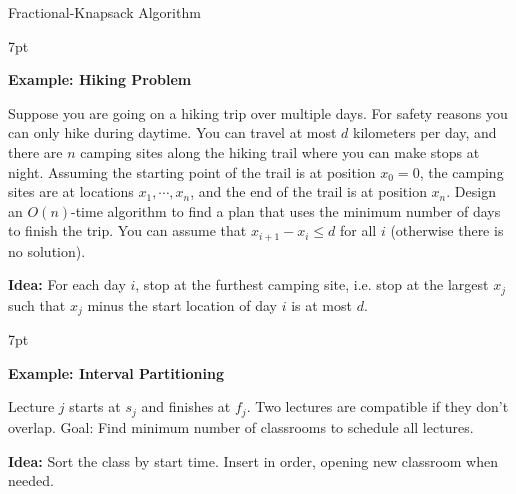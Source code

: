 \documentclass[10pt]{article}
\newenvironment{formal}[2]{%
	\def\FrameCommand{%
		\hspace{1pt}%
		{\color{#1}\vrule width 2pt}%
		{\color{#2}\vrule width 4pt}%
		\colorbox{#2}%
	}%
	\MakeFramed{\advance\hsize-\width\FrameRestore}%
	\noindent\hspace{-4.55pt}%
	\begin{adjustwidth}{}{7pt}%
		\vspace{2pt}\vspace{2pt}%
	}
	{%
		\vspace{2pt}\end{adjustwidth}\endMakeFramed%
}
\begin{document}
\begin{algorithm}
	\SetAlgoLined
	
	\caption{Fractional-Knapsack Algorithm}
\end{algorithm}

\newpage

\begin{formal}{Brown}{brownshade}
	
	\textbf{Example: Hiking Problem}

	Suppose you are going on a hiking trip over multiple days. For safety reasons you can only hike during daytime. You can travel at most $d$ kilometers per day, and there are $n$ camping sites along the hiking trail where you can make stops at night.
	Assuming the starting point of the trail is at position $x_0 = 0$, the camping sites are at locations $x_1, \cdots, x_n$, and the end of the trail is at position $x_n$.
	Design an $O(n)$-time algorithm to find a plan that uses the minimum number of days to finish the trip. You can assume that $x_{i+1} − x_i \leq d$ for all $i$ (otherwise there is no solution).

	\textbf{Idea:} For each day $i$, stop at the furthest camping site, i.e. stop at the largest $x_j$ such that $x_j$ minus the start location of day $i$ is at most $d$.

\end{formal}

\begin{formal}{Brown}{brownshade}
	
	\textbf{Example: Interval Partitioning}

	Lecture $j$ starts at $s_j$ and finishes at $f_j$. Two lectures are compatible if they don't overlap. Goal: Find minimum number of classrooms to schedule all lectures.

	\textbf{Idea:} Sort the class by start time. Insert in order, opening new classroom when needed.

\end{formal}
\end{document}
